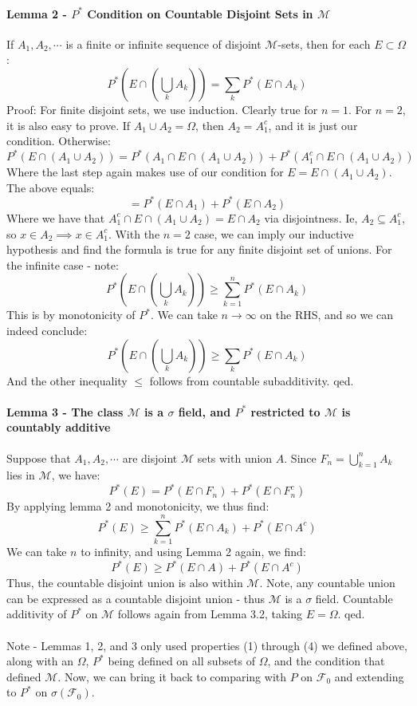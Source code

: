 \documentclass[12pt,a4paper]{article}
\newcommand{\1}[1]{\mathbbm{1}\left\{ #1 \right\}}
\newcommand{\fcal}{\mathcal{F}}
\newcommand{\mcal}{\mathcal{M}}
\begin{document}
\paragraph{Lemma 2 - $P^*$ Condition on Countable Disjoint Sets in $\mcal$} If $A_1, A_2, \cdots$ is a finite or infinite sequence of disjoint $\mcal$-sets, then for each $E \subset \Omega$:
$$
	P^*\left(E \cap \left(\bigcup_k A_k\right)\right) =
	\sum_k P^*(E \cap A_k)
$$
Proof: For finite disjoint sets, we use induction. Clearly true for $n = 1$. For $n = 2$, it is also easy to prove. If $A_1 \cup A_2 = \Omega$, then $A_2 = A_1^c$, and it is just our condition. Otherwise:
$$
	P^*(E \cap (A_1 \cup A_2)) = 
	P^*(A_1 \cap E \cap (A_1 \cup A_2)) +
	P^*(A_1^c \cap E \cap (A_1 \cup A_2))
$$
Where the last step again makes use of our condition for $E = E \cap (A_1 \cup A_2)$. The above equals:
$$
	=
	P^*(E \cap A_1) +
	P^*(E \cap A_2)
$$
Where we have that $A_1^c \cap E \cap (A_1 \cup A_2) = E \cap A_2$ via disjointness. Ie, $A_2 \subseteq A_1^c$, so $x \in A_2 \implies x \in A_1^c$. With the $n = 2$ case, we can imply our inductive hypothesis and find the formula is true for any finite disjoint set of unions. For the infinite case - note:
$$
	P^*\left(E \cap \left(\bigcup_k A_k\right)\right) \geq 
	\sum_{k=1}^n P^*(E \cap A_k)
$$
This is by monotonicity of $P^*$. We can take $n \to \infty$ on the RHS, and so we can indeed conclude:
$$
	P^*\left(E \cap \left(\bigcup_k A_k\right)\right) \geq \sum_k P^*(E \cap A_k)
$$
And the other inequality $\leq$ follows from countable subadditivity. qed.

\paragraph{Lemma 3 - The class $\mcal$ is a $\sigma$ field, and $P^*$ restricted to $\mcal$ is countably additive} Suppose that $A_1, A_2, \cdots$ are disjoint $\mcal$ sets with union $A$. Since $F_n = \bigcup_{k=1}^n A_k$ lies in $\mcal$, we have:
$$
	P^*(E) = P^*(E \cap F_n) + P^*(E \cap F_n^c)
$$
By applying lemma 2 and monotonicity, we thus find:
$$
	P^*(E) \geq \sum_{k=1}^n P^*(E \cap A_k) + P^*(E \cap A^c)
$$
We can take $n$ to infinity, and using Lemma 2 again, we find:
$$
	P^*(E) \geq P^*(E \cap A) + P^*(E \cap A^c)
$$
Thus, the countable disjoint union is also within $\mcal$. Note, any countable union can be expressed as a countable disjoint union - thus $\mcal$ is a $\sigma$ field. Countable additivity of $P^*$ on $\mcal$ follows again from Lemma 3.2, taking $E = \Omega$. qed.
\\\\
Note - Lemmas 1, 2, and 3 only used properties (1) through (4) we defined above, along with an $\Omega$, $P^*$ being defined on all subsets of $\Omega$, and the condition that defined $\mcal$. Now, we can bring it back to comparing with $P$ on $\fcal_0$ and extending to $P^*$ on $\sigma(\fcal_0)$.
\end{document}
